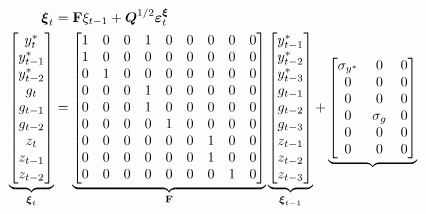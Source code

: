 \documentclass[12pt,a4paper]{article}
\begin{document}
\begin{align}
\boldsymbol{\xi }_{t}& =\mathbf{F}\xi _{t-1}+\boldsymbol{Q}^{1/2}\boldsymbol{%
\varepsilon }_{t}^{\boldsymbol{\xi }}  \notag \\
\underbrace{%
\begin{bmatrix}
y_{t}^{\ast } \\ 
y_{t-1}^{\ast } \\ 
y_{t-2}^{\ast } \\ 
g_{t} \\ 
g_{t-1} \\ 
g_{t-2} \\ 
z_{t} \\ 
z_{t-1} \\ 
z_{t-2}%
\end{bmatrix}%
}_{\boldsymbol{\xi }_{t}}& =\underbrace{%
\begin{bmatrix}
1 & 0 & 0 & 1 & 0 & 0 & 0 & 0 & 0 \\ 
1 & 0 & 0 & 0 & 0 & 0 & 0 & 0 & 0 \\ 
0 & 1 & 0 & 0 & 0 & 0 & 0 & 0 & 0 \\ 
0 & 0 & 0 & 1 & 0 & 0 & 0 & 0 & 0 \\ 
0 & 0 & 0 & 1 & 0 & 0 & 0 & 0 & 0 \\ 
0 & 0 & 0 & 0 & 1 & 0 & 0 & 0 & 0 \\ 
0 & 0 & 0 & 0 & 0 & 0 & 1 & 0 & 0 \\ 
0 & 0 & 0 & 0 & 0 & 0 & 1 & 0 & 0 \\ 
0 & 0 & 0 & 0 & 0 & 0 & 0 & 1 & 0%
\end{bmatrix}%
}_{\mathbf{F}}\underbrace{%
\begin{bmatrix}
y_{t-1}^{\ast } \\ 
y_{t-2}^{\ast } \\ 
y_{t-3}^{\ast } \\ 
g_{t-1} \\ 
g_{t-2} \\ 
g_{t-3} \\ 
z_{t-1} \\ 
z_{t-2} \\ 
z_{t-3}%
\end{bmatrix}%
}_{\boldsymbol{\xi }_{t-1}}+\underbrace{%
\begin{bmatrix}
\sigma _{y^{\ast }} & 0 & 0 \\ 
0 & 0 & 0 \\ 
0 & 0 & 0 \\ 
0 & \sigma _{g} & 0 \\ 
0 & 0 & 0 \\ 
0 & 0 & 0 \\ 

\end{bmatrix}}
\end{align}
\end{document}
